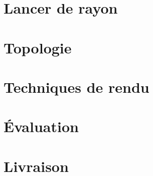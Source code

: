 \documentclass[12pt]{article}
\begin{document}
\pagebreak

\section{Lancer de rayon}

\pagebreak

\section{Topologie}

\pagebreak

\section{Techniques de rendu}

\pagebreak

\section*{Évaluation}

\pagebreak

\section*{Livraison}

\pagebreak
\end{document}

